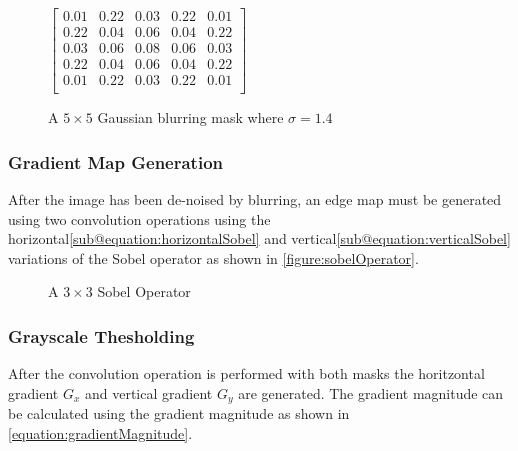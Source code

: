 \documentclass[conference]{IEEEtran}
\begin{document}
\begin{figure}[h] %
  \centering
  $\begin{bmatrix}
  0.01 & 0.22 & 0.03 & 0.22 & 0.01 \\
  0.22 & 0.04 & 0.06 & 0.04 & 0.22 \\
  0.03 & 0.06 & 0.08 & 0.06 & 0.03 \\
  0.22 & 0.04 & 0.06 & 0.04 & 0.22 \\
  0.01 & 0.22 & 0.03 & 0.22 & 0.01 \\
\end{bmatrix}$\caption{A $5 \times 5$ Gaussian blurring mask where $\sigma = 1.4$}\label{equation:gaussian5by5}
\end{figure}


\subsubsection{Gradient Map Generation}
After the image has been de-noised by blurring, an edge map must be generated using two convolution operations using the horizontal\ref*{sub@equation:horizontalSobel} and  vertical\ref*{sub@equation:verticalSobel} variations of the Sobel operator as shown in \autoref{figure:sobelOperator}.
\begin{figure}[h] %
  \centering
  \hfil
  \caption{A $3 \times 3$ Sobel Operator}\label{figure:sobelOperator}
\end{figure}

\subsubsection{Grayscale Thesholding}
After the convolution operation is performed with both masks the horitzontal gradient $G_x$ and vertical gradient $G_y$ are generated. 
The gradient magnitude can be calculated using the gradient magnitude as shown in \autoref{equation:gradientMagnitude}.
\end{document}
